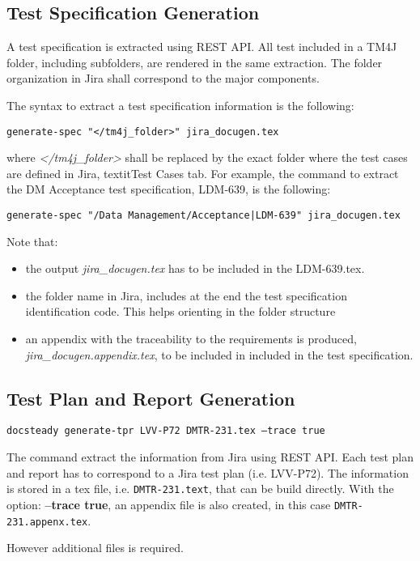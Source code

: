 \documentclass[DM]{lsstdoc}
\begin{document}
\subsection{Test Specification Generation}

A test specification is extracted using REST API.
All test included in a TM4J folder, including subfolders, are rendered in the same extraction.
The folder organization in Jira shall correspond to the major components.

The syntax to extract a test specification information is the following:

\texttt{generate-spec "</tm4j_folder>" jira\_docugen.tex}

where \textit{</tm4j_folder>} shall be replaced by the exact folder where the test cases are defined in Jira, textit{Test Cases} tab.
For example, the command to extract the DM Acceptance test specification, LDM-639, is the following:

\texttt{generate-spec "/Data Management/Acceptance|LDM-639" jira\_docugen.tex}

Note that:
\begin{itemize}
\item the output \textit{jira\_docugen.tex} has to be included in the LDM-639.tex.
\item the folder name in Jira, includes at the end the test specification identification code. This helps orienting in the folder structure
\item an appendix with the traceability to the requirements is produced, \textit{jira\_docugen.appendix.tex}, to be included in included in the test specification.
\end{itemize}



\subsection{Test Plan and Report Generation}

\texttt{docsteady generate-tpr LVV-P72 DMTR-231.tex --trace true}

The command extract the information from Jira using REST API.
Each test plan and report has to correspond to a Jira test plan (i.e. LVV-P72).
The information is stored in a tex file, i.e. \texttt{DMTR-231.text}, that can be build directly.
With the option: \textbf{--trace true}, an appendix file is also created, in this case \texttt{DMTR-231.appenx.tex}.

However additional files is required.
\end{document}
